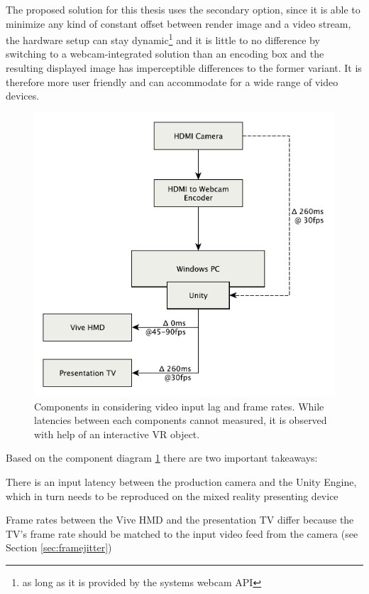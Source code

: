 The proposed solution for this thesis uses the secondary option, since it is 
able to minimize any kind of constant offset between render image and a video 
stream, the hardware setup can stay dynamic\footnote{as long as it is provided 
by the systems webcam API} and it is little to no difference by switching to a 
webcam-integrated solution than an encoding box and the resulting displayed 
image has imperceptible differences to the former variant. It is therefore more 
user friendly and can accommodate for a wide range of video devices.

\begin{figure}[htb]
	\centering
	\includegraphics[width=.85\textwidth]{gfx/FPS-Timing-Components.pdf}
	\caption{Components in considering video input lag and frame rates. While 
	latencies between each components cannot measured, it is observed with help 
	of an interactive VR object.}
	\label{fig:offsets:components}
\end{figure}

Based on the component diagram \ref{fig:offsets:components} there are two 
important takeaways: 

\begin{my_list}
	\item There is an input latency between the production camera and the Unity 
	Engine, which in turn needs to be reproduced on the mixed reality 
	presenting device
	\item Frame rates between the Vive HMD and the presentation TV differ 
	because the TV's frame rate should be matched to the input video feed from 
	the camera (see Section \ref{sec:framejitter})
\end{my_list}

